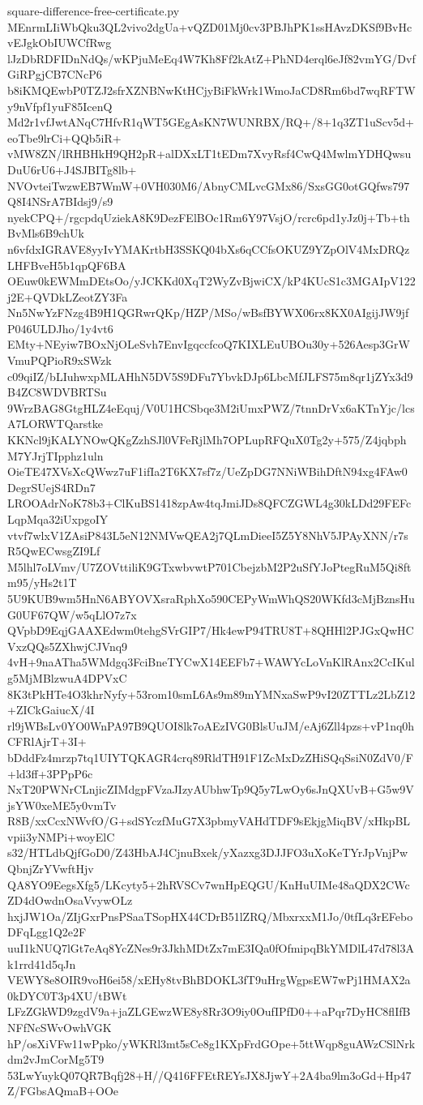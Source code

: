 \documentclass[11pt]{article}
\theoremstyle{definition}
\theoremstyle{remark}
\begin{document}
\begin{filecontents*}[overwrite]{square-difference-free-certificate.py}
MEnrmLIiWbQku3QL2vivo2dgUa+vQZD01Mj0cv3PBJhPK1ssHAvzDKSf9BvHcvEJgkObIUWCfRwg
lJzDbRDFIDnNdQs/wKPjuMeEq4W7Kh8Ff2kAtZ+PhND4erql6eJf82vmYG/DvfGiRPgjCB7CNcP6
b8iKMQEwbP0TZJ2sfrXZNBNwKtHCjyBiFkWrk1WmoJaCD8Rm6bd7wqRFTWy9nVfpf1yuF85IcenQ
Md2r1vfJwtANqC7HfvR1qWT5GEgAsKN7WUNRBX/RQ+/8+1q3ZT1uScv5d+eoTbe9lrCi+QQb5iR+
vMW8ZN/lRHBHkH9QH2pR+alDXxLT1tEDm7XvyRsf4CwQ4MwlmYDHQwsuDuU6rU6+J4SJBITg8lb+
NVOvteiTwzwEB7WmW+0VH030M6/AbnyCMLvcGMx86/SxsGG0otGQfws797Q8I4NSrA7BIdsj9/s9
nyekCPQ+/rgcpdqUziekA8K9DezFElBOc1Rm6Y97VsjO/rcrc6pd1yJz0j+Tb+thBvMls6B9chUk
n6vfdxIGRAVE8yyIvYMAKrtbH3SSKQ04bXs6qCCfsOKUZ9YZpOlV4MxDRQzLHFBveH5b1qpQF6BA
OEuw0kEWMmDEtsOo/yJCKKd0XqT2WyZvBjwiCX/kP4KUcS1c3MGAIpV122j2E+QVDkLZeotZY3Fa
Nn5NwYzFNzg4B9H1QGRwrQKp/HZP/MSo/wBsfBYWX06rx8KX0AIgijJW9jfP046ULDJho/1y4vt6
EMty+NEyiw7BOxNjOLeSvh7EnvIgqccfcoQ7KIXLEuUBOu30y+526Aesp3GrWVmuPQPioR9xSWzk
c09qiIZ/bLIuhwxpMLAHhN5DV5S9DFu7YbvkDJp6LbcMfJLFS75m8qr1jZYx3d9B4ZC8WDVBRTSu
9WrzBAG8GtgHLZ4eEquj/V0U1HCSbqe3M2iUmxPWZ/7tnnDrVx6aKTnYjc/lcsA7LORWTQarstke
KKNcl9jKALYNOwQKgZzhSJl0VFeRjlMh7OPLupRFQuX0Tg2y+575/Z4jqbphM7YJrjTIpphz1uln
OieTE47XVsXcQWwz7uF1ifIa2T6KX7sf7z/UeZpDG7NNiWBihDftN94xg4FAw0DegrSUejS4RDn7
LROOAdrNoK78b3+ClKuBS1418zpAw4tqJmiJDs8QFCZGWL4g30kLDd29FEFcLqpMqa32iUxpgoIY
vtvf7wlxV1ZAsiP843L5eN12NMVwQEA2j7QLmDieeI5Z5Y8NhV5JPAyXNN/r7sR5QwECwsgZI9Lf
M5lhl7oLVmv/U7ZOVttiliK9GTxwbvwtP701CbejzbM2P2uSfYJoPtegRuM5Qi8ftm95/yHs2t1T
5U9KUB9wm5HnN6ABYOVXsraRphXo590CEPyWmWhQS20WKfd3cMjBznsHuG0UF67QW/w5qLlO7z7x
QVpbD9EqjGAAXEdwm0tehgSVrGIP7/Hk4ewP94TRU8T+8QHHl2PJGxQwHCVxzQQs5ZXhwjCJVnq9
4vH+9naATha5WMdgq3FciBneTYCwX14EEFb7+WAWYcLoVnKlRAnx2CcIKulg5MjMBlzwuA4DPVxC
8K3tPkHTe4O3khrNyfy+53rom10smL6As9m89mYMNxaSwP9vI20ZTTLz2LbZ12+ZICkGaiucX/4I
rl9jWBsLv0YO0WnPA97B9QUOI8lk7oAEzIVG0BlsUuJM/eAj6Zll4pzs+vP1nq0hCFRlAjrT+3I+
bDddFz4mrzp7tq1UIYTQKAGR4crq89RldTH91F1ZcMxDzZHiSQqSsiN0ZdV0/F+ld3ff+3PPpP6c
NxT20PWNrCLnjicZIMdgpFVzaJIzyAUbhwTp9Q5y7LwOy6sJnQXUvB+G5w9VjsYW0xeME5y0vmTv
R8B/xxCcxNWvfO/G+sdSYczfMuG7X3pbmyVAHdTDF9sEkjgMiqBV/xHkpBLvpii3yNMPi+woyElC
s32/HTLdbQjfGoD0/Z43HbAJ4CjnuBxek/yXazxg3DJJFO3uXoKeTYrJpVnjPwQbnjZrYVwftHjv
QA8YO9EegsXfg5/LKcyty5+2hRVSCv7wnHpEQGU/KnHuUIMe48aQDX2CWcZD4dOwdnOsaVvywOLz
hxjJW1Oa/ZIjGxrPnsPSaaTSopHX44CDrB51lZRQ/MbxrxxM1Jo/0tfLq3rEFeboDFqLgg1Q2e2F
uuI1kNUQ7lGt7eAq8YcZNes9r3JkhMDtZx7mE3IQa0fOfmipqBkYMDlL47d78l3Ak1rrd41d5qJn
VEWY8e8OIR9voH6ei58/xEHy8tvBhBDOKL3fT9uHrgWgpsEW7wPj1HMAX2a0kDYC0T3p4XU/tBWt
LFzZGkWD9zgdV9a+jaZLGEwzWE8y8Rr3O9iy0OufIPfD0++aPqr7DyHC8flIfBNFfNcSWvOwhVGK
hP/osXiVFw11wPpko/yWKRl3mt5sCe8g1KXpFrdGOpe+5ttWqp8guAWzCSlNrkdm2vJmCorMg5T9
53LwYuykQ07QR7Bqfj28+H//Q416FFEtREYsJX8JjwY+2A4ba9lm3oGd+Hp47Z/FGbsAQmaB+OOe

\end{filecontents*}
\end{document}
